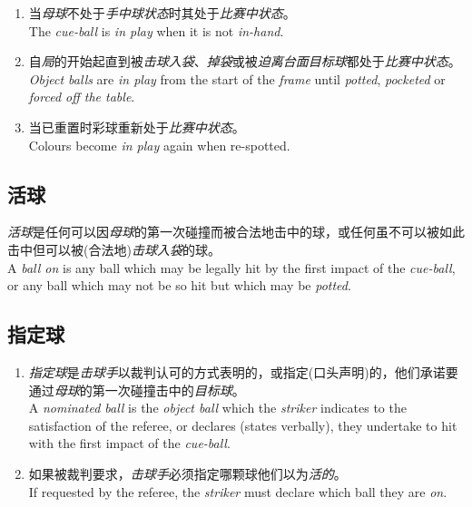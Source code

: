 \begin{enumerate}[label=(\alph*)]
    \item 当\emph{母球}不处于\emph{手中球状态}时其处于\emph{比赛中状态}。\\
    The \emph{cue-ball} is \emph{in play} when it is not \emph{in-hand}.
    \item 自\emph{局}的开始起直到被\emph{击球入袋}、\emph{掉袋}或被\emph{迫离台面}\emph{目标球}都处于\emph{比赛中状态}。\\
    \emph{Object balls} are \emph{in play} from the start of the \emph{frame} until \emph{potted}, \emph{pocketed} or \emph{forced off the table}.
    \item 当已重置时彩球重新处于\emph{比赛中状态}。\\
    Colours become \emph{in play} again when re-spotted.
\end{enumerate}

\subsection{活球}

\noindent \emph{活球}是任何可以因\emph{母球}的第一次碰撞而被合法地击中的球，或任何虽不可以被如此击中但可以被(合法地)\emph{击球入袋}的球。\\
A \emph{ball on} is any ball which may be legally hit by the first impact of the \emph{cue-ball}, or any ball which may not be so hit but which may be \emph{potted}.

\subsection{指定球}

\begin{enumerate}[label=(\alph*)]
    \item \emph{指定球}是\emph{击球手}以裁判认可的方式表明的，或指定(口头声明)的，他们承诺要通过\emph{母球}的第一次碰撞击中的\emph{目标球}。\\
    A \emph{nominated ball} is the \emph{object ball} which the \emph{striker} indicates to the satisfaction of the referee, or declares (states verbally), they undertake to hit with the first impact of the \emph{cue-ball}.
    \item 如果被裁判要求，\emph{击球手}必须指定哪颗球他们以为\emph{活的}。\\
    If requested by the referee, the \emph{striker} must declare which ball they are \emph{on}.
\end{enumerate}

